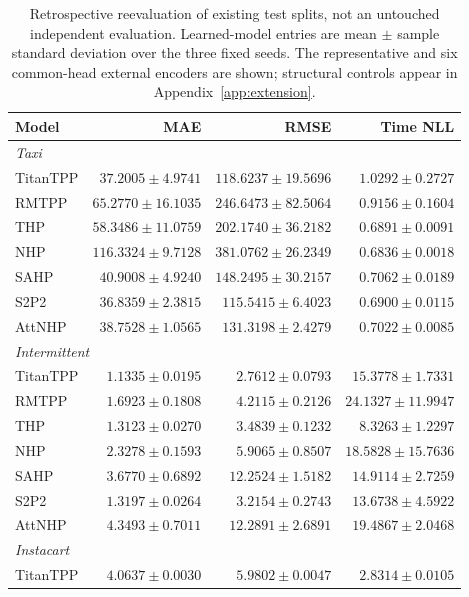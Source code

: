 \documentclass[runningheads]{llncs}
\begin{document}
\begin{table}[p]
\centering\small
\caption{Retrospective reevaluation of existing test splits, not an untouched independent evaluation. Learned-model entries are mean $\pm$ sample standard deviation over the three fixed seeds. The representative and six common-head external encoders are shown; structural controls appear in Appendix~\ref{app:extension}.}
\label{tab:legacy-test-main}
\begin{tabular}{lrrr}
\toprule
Model & MAE & RMSE & Time NLL \\
\midrule
\multicolumn{4}{l}{\textit{Taxi}}\\
TitanTPP & $37.2005 \pm 4.9741$ & $118.6237 \pm 19.5696$ & $1.0292 \pm 0.2727$ \\
RMTPP & $65.2770 \pm 16.1035$ & $246.6473 \pm 82.5064$ & $0.9156 \pm 0.1604$ \\
THP & $58.3486 \pm 11.0759$ & $202.1740 \pm 36.2182$ & $0.6891 \pm 0.0091$ \\
NHP & $116.3324 \pm 9.7128$ & $381.0762 \pm 26.2349$ & $0.6836 \pm 0.0018$ \\
SAHP & $40.9008 \pm 4.9240$ & $148.2495 \pm 30.2157$ & $0.7062 \pm 0.0189$ \\
S2P2 & $36.8359 \pm 2.3815$ & $115.5415 \pm 6.4023$ & $0.6900 \pm 0.0115$ \\
AttNHP & $38.7528 \pm 1.0565$ & $131.3198 \pm 2.4279$ & $0.7022 \pm 0.0085$ \\
\midrule
\multicolumn{4}{l}{\textit{Intermittent}}\\
TitanTPP & $1.1335 \pm 0.0195$ & $2.7612 \pm 0.0793$ & $15.3778 \pm 1.7331$ \\
RMTPP & $1.6923 \pm 0.1808$ & $4.2115 \pm 0.2126$ & $24.1327 \pm 11.9947$ \\
THP & $1.3123 \pm 0.0270$ & $3.4839 \pm 0.1232$ & $8.3263 \pm 1.2297$ \\
NHP & $2.3278 \pm 0.1593$ & $5.9065 \pm 0.8507$ & $18.5828 \pm 15.7636$ \\
SAHP & $3.6770 \pm 0.6892$ & $12.2524 \pm 1.5182$ & $14.9114 \pm 2.7259$ \\
S2P2 & $1.3197 \pm 0.0264$ & $3.2154 \pm 0.2743$ & $13.6738 \pm 4.5922$ \\
AttNHP & $4.3493 \pm 0.7011$ & $12.2891 \pm 2.6891$ & $19.4867 \pm 2.0468$ \\
\midrule
\multicolumn{4}{l}{\textit{Instacart}}\\
TitanTPP & $4.0637 \pm 0.0030$ & $5.9802 \pm 0.0047$ & $2.8314 \pm 0.0105$ \\

\end{tabular}
\end{table}
\end{document}
